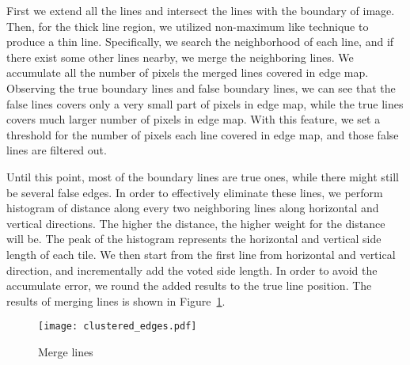\begin{enumerate}
			First we extend all the lines and intersect the lines with the boundary of image. Then, for 
			the thick line region, we utilized non-maximum like technique to produce a thin line. Specifically, 
			we search the neighborhood of each line, and if there exist some other lines nearby, we merge the 
			neighboring lines. We accumulate all the number of pixels the merged lines covered in edge map. 
			Observing the true boundary lines and false boundary lines, we can see that the false lines covers 
			only a very small part of pixels in edge map, while the true lines covers much larger number of pixels 
			in edge map. With this feature, we set a threshold for the number of pixels each line covered in edge 
			map, and those false lines are filtered out. 
			
			Until this point, most of the boundary lines are true ones, while there might still be several false 
			edges. In order to effectively eliminate these lines, we perform histogram of distance along every two 
			neighboring lines along horizontal and vertical directions. The higher the distance, the higher weight 
			for the distance will be. The peak of the histogram represents the horizontal and vertical side length 
			of each tile. We then start from the first line from horizontal and vertical direction, and 
			incrementally add the voted side length. In order to avoid the accumulate error, we round the added 
			results to the true line position. The results of merging lines is shown in Figure~\ref{Merge_line}. 
			
			\begin{figure}[htbp]
				  \centering
				  \texttt{[image: clustered\_edges.pdf]}
				  \caption{Merge lines}
				  \label{Merge_line}
			\end{figure}
			
\end{enumerate}

 


